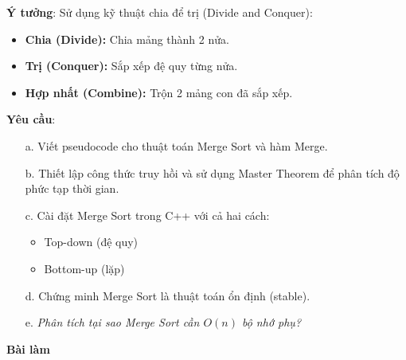\documentclass[12pt,a4paper]{article}
\begin{document}
\textbf{Ý tưởng}: Sử dụng kỹ thuật chia để trị (Divide and Conquer):
\begin{itemize}
    \item \textbf{Chia (Divide):} Chia mảng thành 2 nửa.
    \item \textbf{Trị (Conquer):} Sắp xếp đệ quy từng nửa.
    \item \textbf{Hợp nhất (Combine):} Trộn 2 mảng con đã sắp xếp.
\end{itemize}

\textbf{Yêu cầu}:
\begin{enumerate}
    \item[a.] Viết pseudocode cho thuật toán Merge Sort và hàm Merge.
    \item[b.] Thiết lập công thức truy hồi và sử dụng Master Theorem để phân tích độ phức tạp thời gian.
    \item[c.] Cài đặt Merge Sort trong C++ với cả hai cách:
        \begin{itemize}
            \item Top-down (đệ quy)
            \item Bottom-up (lặp)
        \end{itemize}
    \item[d.] Chứng minh Merge Sort là thuật toán ổn định (stable).
    \item[e.] \textit{Phân tích tại sao Merge Sort cần $O(n)$ bộ nhớ phụ?}
\end{enumerate}

\begin{center}
    \textbf{Bài làm}
\end{center}
\end{document}
